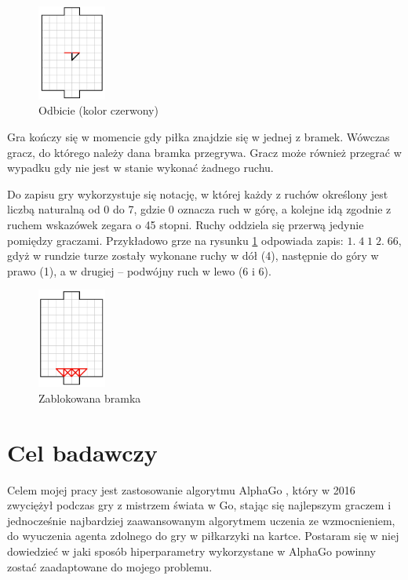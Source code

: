 \documentclass[licencjacka]{pracamgr}
\begin{document}
\begin{figure}[ht]
  \centering
  \includegraphics[width=0.2\textwidth]{odbicie}
  \caption{Odbicie (kolor czerwony)}
  \label{fig:odbicie}
\end{figure}

Gra kończy się w momencie gdy piłka znajdzie się w jednej z bramek.
Wówczas gracz, do którego należy dana bramka przegrywa. 
Gracz może również przegrać w wypadku gdy nie jest w stanie wykonać żadnego ruchu.

Do zapisu gry wykorzystuje się notację, w której każdy z ruchów określony jest liczbą naturalną od 0 do 7, gdzie 0 oznacza ruch w górę, a kolejne idą zgodnie z ruchem wskazówek zegara o 45 stopni. Ruchy oddziela się przerwą jedynie pomiędzy graczami. Przykładowo grze na rysunku \ref{fig:odbicie} odpowiada zapis: $ 1. \; 4 \;1 \; 2. \; 66 $, gdyż w rundzie turze zostały wykonane ruchy w dół (4), następnie do góry w prawo (1), a w drugiej -- podwójny ruch w lewo (6 i 6).

\begin{figure}[ht]
  \centering
  \includegraphics[width=0.2\textwidth]{zablokowanie}
  \caption{Zablokowana bramka}
\end{figure}
 
\section{Cel badawczy} 


Celem mojej pracy jest zastosowanie algorytmu AlphaGo \cite{alphago2016, alphagozero}, który w 2016 zwyciężył podczas gry z mistrzem świata w Go, stając się najlepszym graczem i jednocześnie najbardziej zaawansowanym algorytmem uczenia ze wzmocnieniem, do wyuczenia agenta zdolnego do gry w piłkarzyki na kartce. Postaram się w niej dowiedzieć w jaki sposób hiperparametry wykorzystane w AlphaGo powinny zostać zaadaptowane do mojego problemu. 
\end{document}
